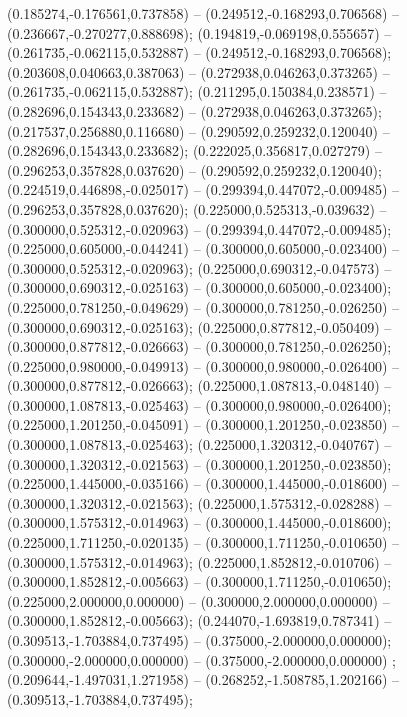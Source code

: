  (0.185274,-0.176561,0.737858) -- (0.249512,-0.168293,0.706568) -- (0.236667,-0.270277,0.888698);
 (0.194819,-0.069198,0.555657) -- (0.261735,-0.062115,0.532887) -- (0.249512,-0.168293,0.706568);
 (0.203608,0.040663,0.387063) -- (0.272938,0.046263,0.373265) -- (0.261735,-0.062115,0.532887);
 (0.211295,0.150384,0.238571) -- (0.282696,0.154343,0.233682) -- (0.272938,0.046263,0.373265);
 (0.217537,0.256880,0.116680) -- (0.290592,0.259232,0.120040) -- (0.282696,0.154343,0.233682);
 (0.222025,0.356817,0.027279) -- (0.296253,0.357828,0.037620) -- (0.290592,0.259232,0.120040);
 (0.224519,0.446898,-0.025017) -- (0.299394,0.447072,-0.009485) -- (0.296253,0.357828,0.037620);
 (0.225000,0.525313,-0.039632) -- (0.300000,0.525312,-0.020963) -- (0.299394,0.447072,-0.009485);
 (0.225000,0.605000,-0.044241) -- (0.300000,0.605000,-0.023400) -- (0.300000,0.525312,-0.020963);
 (0.225000,0.690312,-0.047573) -- (0.300000,0.690312,-0.025163) -- (0.300000,0.605000,-0.023400);
 (0.225000,0.781250,-0.049629) -- (0.300000,0.781250,-0.026250) -- (0.300000,0.690312,-0.025163);
 (0.225000,0.877812,-0.050409) -- (0.300000,0.877812,-0.026663) -- (0.300000,0.781250,-0.026250);
 (0.225000,0.980000,-0.049913) -- (0.300000,0.980000,-0.026400) -- (0.300000,0.877812,-0.026663);
 (0.225000,1.087813,-0.048140) -- (0.300000,1.087813,-0.025463) -- (0.300000,0.980000,-0.026400);
 (0.225000,1.201250,-0.045091) -- (0.300000,1.201250,-0.023850) -- (0.300000,1.087813,-0.025463);
 (0.225000,1.320312,-0.040767) -- (0.300000,1.320312,-0.021563) -- (0.300000,1.201250,-0.023850);
 (0.225000,1.445000,-0.035166) -- (0.300000,1.445000,-0.018600) -- (0.300000,1.320312,-0.021563);
 (0.225000,1.575312,-0.028288) -- (0.300000,1.575312,-0.014963) -- (0.300000,1.445000,-0.018600);
 (0.225000,1.711250,-0.020135) -- (0.300000,1.711250,-0.010650) -- (0.300000,1.575312,-0.014963);
 (0.225000,1.852812,-0.010706) -- (0.300000,1.852812,-0.005663) -- (0.300000,1.711250,-0.010650);
 (0.225000,2.000000,0.000000) -- (0.300000,2.000000,0.000000) -- (0.300000,1.852812,-0.005663);
 (0.244070,-1.693819,0.787341) -- (0.309513,-1.703884,0.737495) -- (0.375000,-2.000000,0.000000);
 (0.300000,-2.000000,0.000000) -- (0.375000,-2.000000,0.000000) ;
 (0.209644,-1.497031,1.271958) -- (0.268252,-1.508785,1.202166) -- (0.309513,-1.703884,0.737495);
